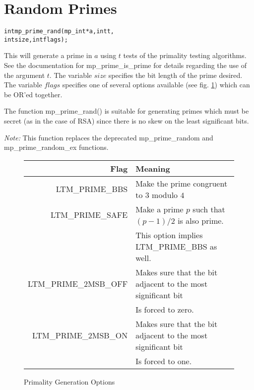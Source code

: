 \documentclass[synpaper]{book}
\begin{document}
\section{Random Primes}
\begin{alltt}
int mp_prime_rand(mp_int *a,    int t,
                  int     size, int flags);
\end{alltt}
This will generate a prime in $a$ using $t$ tests of the primality testing algorithms.
See the documentation for mp\_prime\_is\_prime for details regarding the use of the argument $t$.
The variable $size$ specifies the bit length of the prime desired.
The variable $flags$ specifies one of several options available
(see fig. \ref{fig:primeopts}) which can be OR'ed together.

The function mp\_prime\_rand() is suitable for generating primes which must be secret (as in the case of RSA) since there
is no skew on the least significant bits.

\textit{Note:} This function replaces the deprecated mp\_prime\_random and mp\_prime\_random\_ex functions.

\begin{figure}[h]
\begin{center}
\begin{small}
\begin{tabular}{|r|l|}
\hline \textbf{Flag}         & \textbf{Meaning} \\
\hline LTM\_PRIME\_BBS       & Make the prime congruent to $3$ modulo $4$ \\
\hline LTM\_PRIME\_SAFE      & Make a prime $p$ such that $(p - 1)/2$ is also prime. \\
                             & This option implies LTM\_PRIME\_BBS as well. \\
\hline LTM\_PRIME\_2MSB\_OFF & Makes sure that the bit adjacent to the most significant bit \\
                             & Is forced to zero.  \\
\hline LTM\_PRIME\_2MSB\_ON  & Makes sure that the bit adjacent to the most significant bit \\
                             & Is forced to one. \\
\hline
\end{tabular}
\end{small}
\end{center}
\caption{Primality Generation Options}
\label{fig:primeopts}
\end{figure}
\end{document}
